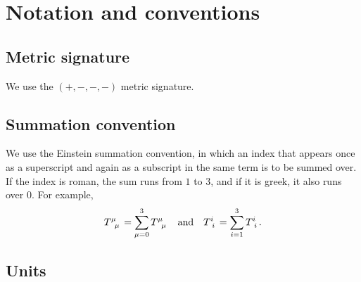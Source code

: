\chapter*{Notation and conventions} %

\section*{Metric signature}

We use the $(+,-,-,-)$ metric signature.

\section*{Summation convention}

We use the Einstein summation convention, in which an index that appears once as a superscript and again as a subscript in the same term is to be summed over.
If the index is roman, the sum runs from $1$ to $3$, and if it is greek, it also runs over $0$.
For example,
\begin{equation*}
	T\indices{^\mu_\mu} = \sum_{\mu=0}^3 T\indices{^\mu_\mu}
	\quad \text{and} \quad
	T\indices{^i_i} = \sum_{i=1}^3 T\indices{^i_i}
	.
\end{equation*}

\iffalse
\section*{Fourier transformation}

We use the Fourier transformation convention
\begin{equation}
	f(k) = \int \dif x \, e^{i k x} f(x)
	\qquad \text{and} \qquad
	f(x) = \int \frac{\dif k}{2 \pi} \, e^{-i k x} f(k) .
\end{equation}
With this convention, the delta function $\delta(x' - x)$ is given by the highlighted part of
\begin{equation}
	f(x) = \int \frac{\dif k}{2 \pi} \, e^{-i k x} f(k)
	     = \int \dif x' \underbrace{\int \frac{\dif k}{2 \pi} \, e^{i k (x'-x)}}_{\displaystyle \delta(x'-x)} f(k) .
\label{eq:pre:delta_function}
\end{equation}
\fi

\section*{Units}



